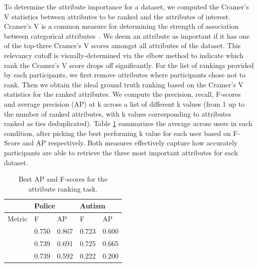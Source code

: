 To determine the attribute importance for a dataset, we computed the Cramer's V statistics between attributes to be ranked and the attributes of interest. Cramer's V is a common measure for determining the strength of association between categorical attributes~\cite{McHugh2013}. We deem an attribute as important if it has one of the top-three Cramer's V scores amongst all attributes of the dataset. This relevancy cutoff is visually-determined via the elbow method to indicate which rank the Cramer's V score drops off significantly. For the list of rankings provided by each participants, we first remove attributes where participants chose not to rank. Then we obtain the ideal ground truth ranking based on the Cramer's V statistics for the ranked attributes. We compute the precision, recall, F-scores and average precision (AP) at k across a list of different k values (from 1 up to the number of ranked attributes, with k values corresponding to attributes ranked as ties deduplicated). Table \ref{table:ranking_results} summarizes the average across users in each condition, after picking the best performing k value for each user based on F-Score and AP respectively. Both measures effectively capture how accurately participants are able to retrieve the three most important attributes for each dataset.
\begin{table}[ht!]
	\centering
	\begin{tabular}{|l|l|l|l|l|}
	\hline
	         & \multicolumn{2}{l|}{Police}                                   & \multicolumn{2}{l|}{Autism}                                   \\ \hline
	Metric   & F                             & AP                            & F                             & AP                            \\ \hline
	\system  & \cellcolor{blue!25}0.750 & \cellcolor{blue!25}0.867 & 0.723                         & 0.600                         \\ \hline
	\cluster & 0.739                         & 0.691                         & \cellcolor{blue!25}0.725 & \cellcolor{blue!25}0.665 \\ \hline
	\BFS     & 0.739                         & 0.592                         & 0.222                         & 0.200                         \\ \hline
	\end{tabular}
	\caption{Best AP and F-scores for the attribute ranking task.}
	\vspace{-10pt}
    \label{table:ranking_results}
\end{table}
